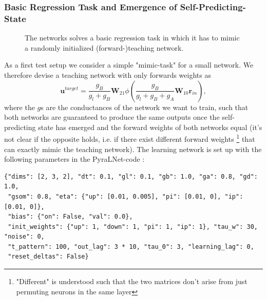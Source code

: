 \documentclass[12pt,a4paper]{article}
\begin{document}
\subsubsection{Basic Regression Task and Emergence of Self-Predicting-State}
\begin{figure}[!ht]
  \centering
  \quad
  \quad
  \quad
  \caption{The networks solves a basic regression task in which it has to mimic a randomly initialized (forward-)teaching network.}
  \label{fig:mimic}
\end{figure}

As a first test setup we consider a simple "mimic-task" for a small network. We therefore devise a teaching network with only forwards weights as 
\begin{equation}
\bm{u}^{target} = \frac{g_B}{g_l + g_B} \bm{W}_{21}\phi\left(\frac{g_B}{g_l + g_B + g_A} \bm{W}_{10} \bm{r}_{in}\right),
\end{equation}
where the $g$s are the conductances of the network we want to train, such that both networks are guaranteed to produce the same outputs once the self-predicting state has emerged and the forward weights of both networks equal (it's not clear if the opposite holds, i.e. if there exist different forward weights \footnote{"Different" is understood such that the two matrices don't arise from just permuting neurons in the same layer} that can exactly mimic the teaching network). The learning network is set up with the following parameters in the PyraLNet-code \cite{code}:
\begin{verbatim}
{"dims": [2, 3, 2], "dt": 0.1, "gl": 0.1, "gb": 1.0, "ga": 0.8, "gd": 1.0,
 "gsom": 0.8, "eta": {"up": [0.01, 0.005], "pi": [0.01, 0], "ip": [0.01, 0]},
 "bias": {"on": False, "val": 0.0},
 "init_weights": {"up": 1, "down": 1, "pi": 1, "ip": 1}, "tau_w": 30, "noise": 0,
 "t_pattern": 100, "out_lag": 3 * 10, "tau_0": 3, "learning_lag": 0,
 "reset_deltas": False}
\end{verbatim}
\end{document}
